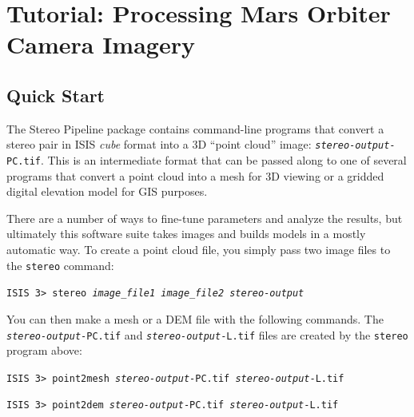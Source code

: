 \chapter{Tutorial: Processing Mars Orbiter Camera Imagery}
\label{ch:tutorial}


\section{Quick Start}

The Stereo Pipeline package contains command-line programs that
convert a stereo pair in ISIS {\em cube} format into a 3D ``point
cloud'' image: \texttt{\textit{stereo-output}-PC.tif}.  This is an
intermediate format that can be passed along to one of several
programs that convert a point cloud into a mesh for 3D viewing or a
gridded digital elevation model for GIS purposes.  

There are a number of ways to fine-tune parameters and analyze the
results, but ultimately this software suite takes images and builds
models in a mostly automatic way.  To create a point cloud file, you
simply pass two image files to the \texttt{stereo} command:

\hspace*{2em}\texttt{ISIS 3> stereo \textit{image\_file1 image\_file2 stereo-output}}
\smallskip

You can then make a mesh or a \ac{DEM} file with the following
commands.  The \texttt{\textit{stereo-output}-PC.tif} and
\texttt{\textit{stereo-output}-L.tif} files are created by the
\texttt{stereo} program above:

\hspace*{2em}\texttt{ISIS 3> point2mesh \textit{stereo-output}-PC.tif \textit{stereo-output}-L.tif}
\smallskip

\hspace*{2em}\texttt{ISIS 3> point2dem \textit{stereo-output}-PC.tif \textit{stereo-output}-L.tif}
\smallskip


